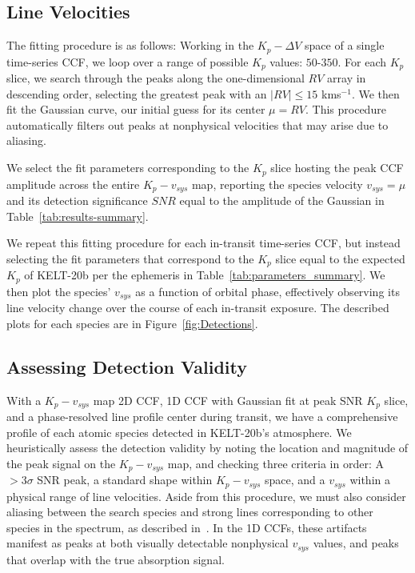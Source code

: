 \documentclass[twocolumn]{aastex631}
\begin{document}
        \subsection{Line Velocities}\label{subsec:Line Velocities}
            The fitting procedure is as follows: Working in the ${K_p-\Delta\!V}$ space of a single time-series CCF, we loop over a range of possible $K_p$ values: $50$-$350$. For each $K_p$ slice, we search through the peaks along the one-dimensional $RV$ array in descending order, selecting the greatest peak with an $|RV| \leq 15$ kms$^{-1}$. We then fit the Gaussian curve, our initial guess for its center $\mu = RV$. This procedure automatically filters out peaks at nonphysical velocities that may arise due to aliasing.
            
            We select the fit parameters corresponding to the $K_p$ slice hosting the peak CCF amplitude across the entire $K_p-v_{sys}$ map, reporting the species velocity $v_{sys} = \mu$ and its detection significance $SNR$ equal to the amplitude of the Gaussian in Table~\ref{tab:results-summary}.
            
            We repeat this fitting procedure for each in-transit time-series CCF, but instead selecting the fit parameters that correspond to the $K_p$ slice equal to the expected $K_p$ of KELT-20b per the ephemeris in Table~\ref{tab:parameters_summary}. We then plot the species' $v_{sys}$ as a function of orbital phase, effectively observing its line velocity change over the course of each in-transit exposure. The described plots for each species are in Figure~\ref{fig:Detections}. 

        \subsection{Assessing Detection Validity}\label{subsec:Assessing Detection Results}
            With a ${K_p-v_{sys}}$ map 2D CCF, 1D CCF with Gaussian fit at peak SNR $K_p$ slice, and a phase-resolved line profile center during transit, we have a comprehensive profile of each atomic species detected in KELT-20b's atmosphere. We heuristically assess the detection validity by noting the location and magnitude of the peak signal on the ${K_p-v_{sys}}$ map, and checking three criteria in order: A $>{3\sigma}$ SNR peak, a standard shape within ${K_p-v_{sys}}$ space, and a $v_{sys}$ within a physical range of line velocities. Aside from this procedure, we must also consider aliasing between the search species and strong lines corresponding to other species in the spectrum, as described in~\citet{Borsato2023}. In the 1D CCFs, these artifacts manifest as peaks at both visually detectable nonphysical $v_{sys}$ values, and peaks that overlap with the true absorption signal.
            
\end{document}
